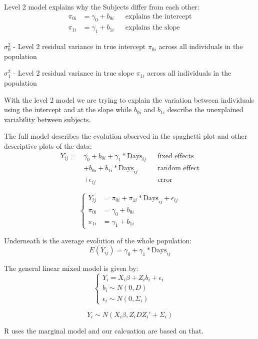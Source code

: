 \documentclass[
]{article}
\begin{document}
Level 2 model explains why the Subjects differ from each other:
\[\begin{aligned}
\pi_{0i} &= \gamma_{0} + b_{0i} && \text{explains the intercept} \\
\pi_{1i} &= \gamma_{1} + b_{1i} && \text{explains the slope}
\end{aligned} \tag{3}\]

\(\sigma_{0}^{2}\) - Level 2 residual variance in true intercept
\(\pi_{0i}\) across all individuals in the population

\(\sigma_{1}^{2}\) - Level 2 residual variance in true slope
\(\pi_{1i}\) across all individuals in the population

With the level 2 model we are trying to explain the variation between
individuals using the intercept and at the slope while \(b_{0i}\) and
\(b_{1i}\) describe the unexplained variability between subjects.

The full model describes the evolution observed in the spaghetti plot
and other descriptive plots of the data: \[\begin{aligned}
Y_{ij} =& \gamma_{0} + b_{0i} + \gamma_{1}* \text{Days}_{ij} &&\text{fixed effects}\\
          &+ b_{0i} + b_{1i}*\text{Days}_{ij} &&\text{random effect}\\
          &+ \epsilon_{ij} &&\text{error}
\end{aligned} \tag{4}\]

\[
\begin{cases}
Y_{ij} &= \pi_{0i} + \pi_{1i}* \text{Days}_{ij} + \epsilon_{ij} \\
\pi_{0i} &= \gamma_{0} + b_{0i}  \\
\pi_{1i} &= \gamma_{1} + b_{1i}
\end{cases} \tag{5}
\]

Underneath is the average evolution of the whole population:
\[E(Y_{ij}) = \gamma_{0} + \gamma_{1}* \text{Days}_{ij} \tag{6}\]

The general linear mixed model is given by: \[\begin{cases}
Y_i = X_i\beta + Z_i b_i + \epsilon_i \\
b_i \sim N(0,D)\\
\epsilon_i \sim N(0,\Sigma_i)
\end{cases}\tag{7}\]

\[Y_i \sim N(X_i\beta, Z_iDZ_i'+\Sigma_i) \tag{8}\]

R uses the marginal model and our calcuation are based on that.
\end{document}
